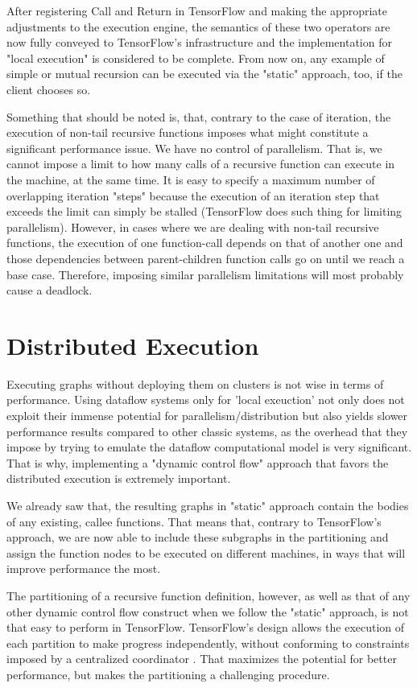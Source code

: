\documentclass[ack,preface]{dithesis}
\begin{document}
After registering Call and Return in TensorFlow and making the appropriate adjustments to the execution engine, the semantics of these two operators are now fully conveyed to TensorFlow's infrastructure and the implementation for "local execution" is considered to be complete. From now on, any example of simple or mutual recursion can be executed via the "static" approach, too, if the client chooses so.

Something that should be noted is, that, contrary to the case of iteration, the execution of non-tail recursive functions imposes what might constitute a significant performance issue.
We have no control of parallelism. That is, we cannot impose a limit to how many calls of a recursive function can execute in the machine, at the same time.
Ιt is easy to specify a maximum number of overlapping iteration "steps"  because the execution of an iteration step that exceeds the limit can simply be stalled (TensorFlow does such thing for limiting parallelism). However, in cases where we are dealing with non-tail recursive functions, the execution of one function-call depends on that of another one and those dependencies between parent-children function calls go on until we reach a base case. Therefore, imposing similar parallelism limitations will most probably cause a deadlock.


    \section{Distributed Execution}

Executing graphs without deploying them on clusters is not wise in terms of performance.  Using dataflow systems only for 'local exeuction' not only does not exploit their immense potential  for parallelism/distribution but also yields slower performance results compared to other classic systems, as the overhead that they impose by trying to emulate the dataflow computational model is very significant. 
That is why, implementing a "dynamic control flow" approach that favors the distributed execution is extremely important. 

We already saw that, the resulting graphs in "static" approach contain the bodies of any existing, callee functions. That means that, contrary to TensorFlow's approach, we are now able to include these subgraphs in the partitioning and assign the function nodes to be executed on different machines, in ways that will improve performance the most.

The partitioning of a recursive function definition, however, as well as that of any other dynamic control flow construct  when we follow the "static" approach, is not that easy to perform in TensorFlow.
TensorFlow's design allows the execution of each partition to make progress independently, without conforming to constraints imposed by a centralized coordinator \cite{Yu:2018}. That maximizes the potential for better performance, but makes the partitioning a challenging procedure.
\end{document}
